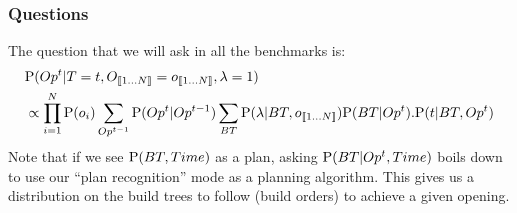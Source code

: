 \subsubsection{Questions}
The question that we will ask in all the benchmarks is:
\begin{eqnarray}
 & \mathrm{P}(Op^t|T=t, O_{\llbracket 1\dots N\rrbracket}=o_{\llbracket 1\dots N\rrbracket}, \lambda = 1) \\
 & \propto \prod_{i=1}^N \mathrm{P}(o_i) \sum_{Op^{t-1}} \mathrm{P}(Op^t|Op^{t-1}) \sum_{BT} \mathrm{P}(\lambda | BT, o_{\llbracket 1\dots N\rrbracket}) \mathrm{P}(BT|Op^t).\mathrm{P}(t|BT, Op^t)
\end{eqnarray}
Note that if we see $\mathrm{P}(BT, Time)$ as a plan, asking $\mathrm{P}(BT|Op^t, Time)$ boils down to use our ``plan recognition'' mode as a planning algorithm. %
This gives us a distribution on the build trees to follow (build orders) to achieve a given opening.

